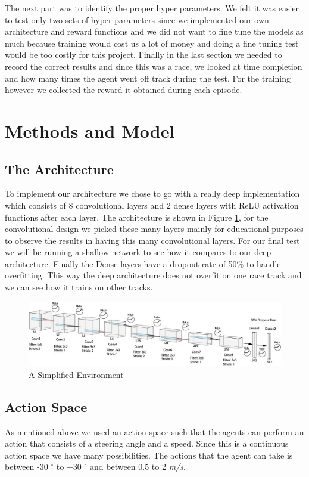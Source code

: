 \documentclass[journal]{IEEEtran}
\begin{document}
The next part was to identify the proper hyper parameters.  We felt it was easier to test only two sets of hyper parameters since we implemented our own architecture and reward functions and we did not want to fine tune the models as much because training would cost us a lot of money and doing a fine tuning test would be too costly for this project.  
Finally in the last section we needed to record the correct results and since this was a race, we looked at time completion and how many times the agent went off track during the test.  For the training however we collected the reward it obtained during each episode.

\section{Methods and Model}
\subsection{The Architecture}
To implement our architecture we chose to go with a really deep implementation which consists of 8 convolutional layers and 2 dense layers with ReLU activation functions after each layer. The architecture is shown in Figure \ref{freire_arch}, for the convolutional design we picked these many layers mainly for educational purposes to observe the results in having this many convolutional layers.  For our final test we will be running a shallow network to see how it compares to our deep architecture.  Finally the Dense layers have a dropout rate of 50\% to handle overfitting.  This way the deep architecture does not overfit on one race track and we can see how it trains on other tracks.

\begin{figure}[t]
\begin{center}
\includegraphics[width=\textwidth]{freire-arch}
\end{center}
\vspace{-2mm}
\caption{A Simplified Environment}
\label{freire_arch}
\end{figure}

\subsection{Action Space}
As mentioned above we used an action space such that the agents can perform an action that consists of a steering angle and a speed.  Since this is a continuous action space we have many possibilities.  The actions that the agent can take is between -30 $^{\circ}$ to +30 $^{\circ}$ and between 0.5 to 2 \emph{m/s}. 
\end{document}
